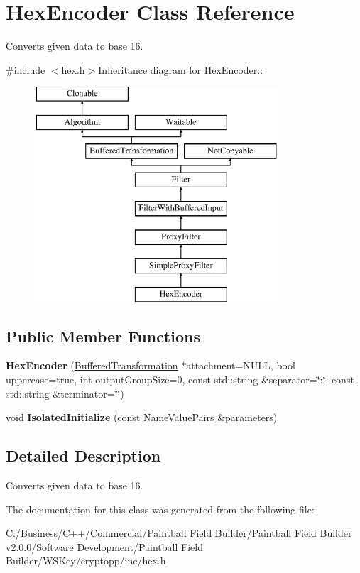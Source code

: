 \hypertarget{class_hex_encoder}{
\section{HexEncoder Class Reference}
\label{class_hex_encoder}
}


Converts given data to base 16.  


{\ttfamily \#include $<$hex.h$>$}Inheritance diagram for HexEncoder::\begin{figure}[H]
\begin{center}
\leavevmode
\includegraphics[height=8cm]{class_hex_encoder}
\end{center}
\end{figure}
\subsection*{Public Member Functions}
\begin{DoxyCompactItemize}
\item 
\hypertarget{class_hex_encoder_a0f4d1e9d67e469d7a51d4c531c2a642b}{
{\bfseries HexEncoder} (\hyperlink{class_buffered_transformation}{BufferedTransformation} $\ast$attachment=NULL, bool uppercase=true, int outputGroupSize=0, const std::string \&separator=\char`\"{}:\char`\"{}, const std::string \&terminator=\char`\"{}\char`\"{})}
\label{class_hex_encoder_a0f4d1e9d67e469d7a51d4c531c2a642b}

\item 
\hypertarget{class_hex_encoder_a082ae0bc1d202336421e5597792ee2d7}{
void {\bfseries IsolatedInitialize} (const \hyperlink{class_name_value_pairs}{NameValuePairs} \&parameters)}
\label{class_hex_encoder_a082ae0bc1d202336421e5597792ee2d7}

\end{DoxyCompactItemize}


\subsection{Detailed Description}
Converts given data to base 16. 

The documentation for this class was generated from the following file:\begin{DoxyCompactItemize}
\item 
C:/Business/C++/Commercial/Paintball Field Builder/Paintball Field Builder v2.0.0/Software Development/Paintball Field Builder/WSKey/cryptopp/inc/hex.h\end{DoxyCompactItemize}
